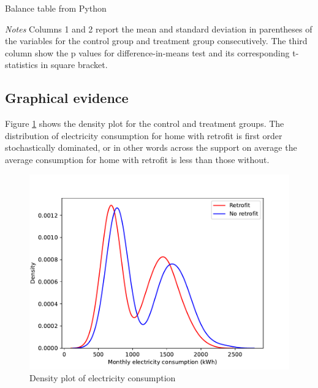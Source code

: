 \documentclass{article}
\begin{document}
\begin{table}[H]\centering
\begin{threeparttable}
    \caption{Balance table from Python}
    \label{t1:balance}
    
    \begin{tablenotes}
    \small \item \textit{Notes} Columns 1 and 2 report the mean and standard deviation in parentheses of the variables for the control group and treatment group consecutively. The third column show the p values for difference-in-means test and its corresponding t-statistics in square bracket.
    \end{tablenotes}
\end{threeparttable}
\end{table}

\subsection{Graphical evidence}
Figure \ref{f1:hist} shows the density plot for the control and treatment groups. The distribution of electricity consumption for home with retrofit is first order stochastically dominated, or in other words across the support on average the average consumption for home with retrofit is less than those without.

\begin{figure}[H]
    \centering
    \includegraphics[scale = 0.6]{./figure/2_hist.pdf}
    \caption{Density plot of electricity consumption}
    \label{f1:hist}
\end{figure}
\end{document}
